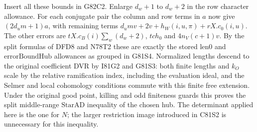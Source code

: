 Insert all these bounds in G82C2. Enlarge $d_w+1$ to $d_w+2$
in the row character allowance. For each conjugate pair the
column and row terms in $a$ now give $(2d_um+1)a$, with remaining
terms $d_um v+2v+h_W(i,u,\pi)+rX.c_0(i,u)$. The other errors
are $tX.c_B(i)\sum_w(d_w+2)$, $tc h_0$ and $4n_V(c+1)v$.
By the split formulas of DFD8 and N78T2 these are exactly the
stored $\mathrm{len0}$ and $\mathrm{errorBoundHub}$ allowances
as grouped in G81S4. Normalized lengths descend to the original
coefficient DVR by I81G2 and G81S3: both finite lengths and
$k_O$ scale by the relative ramification index, including the
evaluation ideal, and the Selmer and local cohomology conditions
commute with this finite free extension. Under the original good
point, killing and odd finiteness guards this proves the split
middle-range $\mathrm{StarAD}$ inequality of the chosen hub.
The determinant applied here is the one for $N$; the larger
restriction image introduced in C81S2 is unnecessary for this
inequality.
